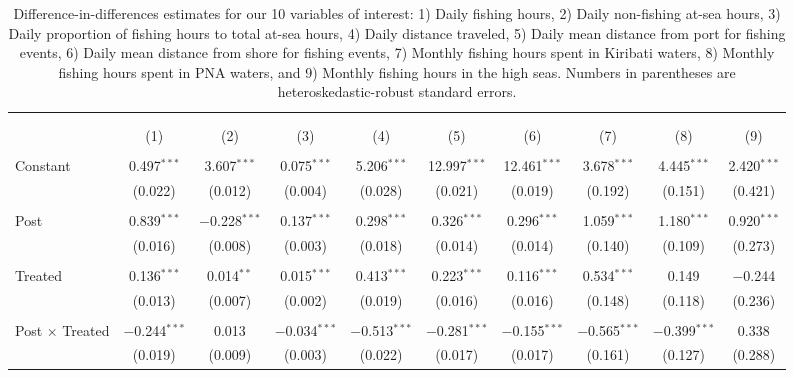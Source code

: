 
\begin{table}[!htbp] \centering 
  \caption{\label{tab:main_DID}Difference-in-differences estimates for our 10 variables of interest: 1) Daily fishing hours, 2) Daily non-fishing at-sea hours, 3) Daily proportion of fishing hours to total at-sea hours, 4) Daily distance traveled, 5) Daily mean distance from port for fishing events, 6) Daily mean distance from shore for fishing events, 7) Monthly fishing hours spent in Kiribati waters, 8) Monthly fishing hours spent in PNA waters, and 9) Monthly fishing hours in the high seas. Numbers in parentheses are heteroskedastic-robust standard errors.} 
  \label{} 
\footnotesize 
\begin{tabular}{@{\extracolsep{1pt}}lccccccccc} 
\\[-1.8ex]\hline 
\hline \\[-1.8ex] 
\\[-1.8ex] & (1) & (2) & (3) & (4) & (5) & (6) & (7) & (8) & (9)\\ 
\hline \\[-1.8ex] 
 Constant & 0.497$^{***}$ & 3.607$^{***}$ & 0.075$^{***}$ & 5.206$^{***}$ & 12.997$^{***}$ & 12.461$^{***}$ & 3.678$^{***}$ & 4.445$^{***}$ & 2.420$^{***}$ \\ 
  & (0.022) & (0.012) & (0.004) & (0.028) & (0.021) & (0.019) & (0.192) & (0.151) & (0.421) \\ 
  & & & & & & & & & \\ 
 Post & 0.839$^{***}$ & $-$0.228$^{***}$ & 0.137$^{***}$ & 0.298$^{***}$ & 0.326$^{***}$ & 0.296$^{***}$ & 1.059$^{***}$ & 1.180$^{***}$ & 0.920$^{***}$ \\ 
  & (0.016) & (0.008) & (0.003) & (0.018) & (0.014) & (0.014) & (0.140) & (0.109) & (0.273) \\ 
  & & & & & & & & & \\ 
 Treated & 0.136$^{***}$ & 0.014$^{**}$ & 0.015$^{***}$ & 0.413$^{***}$ & 0.223$^{***}$ & 0.116$^{***}$ & 0.534$^{***}$ & 0.149 & $-$0.244 \\ 
  & (0.013) & (0.007) & (0.002) & (0.019) & (0.016) & (0.016) & (0.148) & (0.118) & (0.236) \\ 
  & & & & & & & & & \\ 
 Post $\times$ Treated & $-$0.244$^{***}$ & 0.013 & $-$0.034$^{***}$ & $-$0.513$^{***}$ & $-$0.281$^{***}$ & $-$0.155$^{***}$ & $-$0.565$^{***}$ & $-$0.399$^{***}$ & 0.338 \\ 
  & (0.019) & (0.009) & (0.003) & (0.022) & (0.017) & (0.017) & (0.161) & (0.127) & (0.288) \\ 

\end{tabular}
\end{table}
